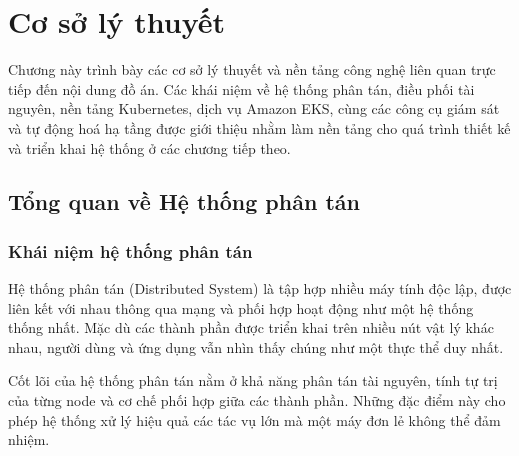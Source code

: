 \chapter{Cơ sở lý thuyết}
\label{chap:chap1-introduce}

Chương này trình bày các cơ sở lý thuyết và nền tảng công nghệ liên quan trực tiếp
đến nội dung đồ án. Các khái niệm về hệ thống phân tán, điều phối tài nguyên,
nền tảng Kubernetes, dịch vụ Amazon EKS, cùng các công cụ giám sát và tự động hoá
hạ tầng được giới thiệu nhằm làm nền tảng cho quá trình thiết kế và triển khai
hệ thống ở các chương tiếp theo.


\section{Tổng quan về Hệ thống phân tán}



\subsection{ Khái niệm hệ thống phân tán}

Hệ thống phân tán (Distributed System) là tập hợp nhiều máy tính độc lập, được liên kết với nhau thông qua mạng và phối hợp hoạt động như một hệ thống thống nhất. Mặc dù các thành phần được triển khai trên nhiều nút vật lý khác nhau, người dùng và ứng dụng vẫn nhìn thấy chúng như một thực thể duy nhất.

Cốt lõi của hệ thống phân tán nằm ở khả năng phân tán tài nguyên, tính tự trị của từng node và cơ chế phối hợp giữa các thành phần. Những đặc điểm này cho phép hệ thống xử lý hiệu quả các tác vụ lớn mà một máy đơn lẻ không thể đảm nhiệm.

